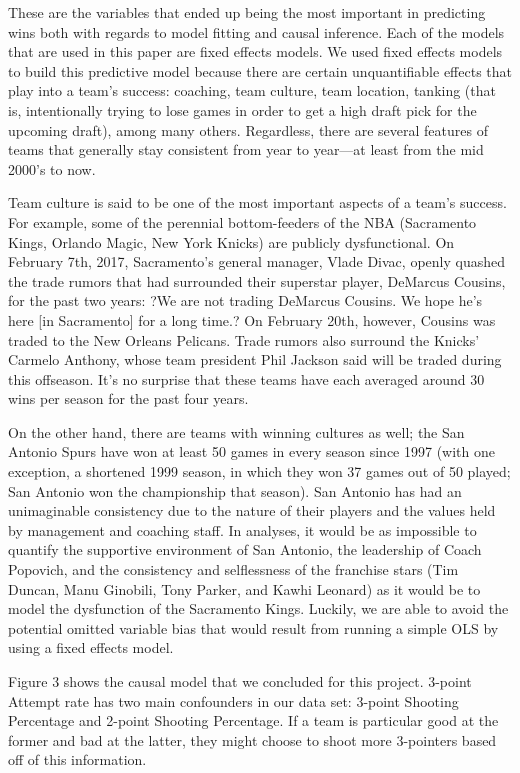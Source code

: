 \documentclass[12pt]{article}
\begin{document}
        	These are the variables that ended up being the most important in predicting wins both with regards to model fitting and causal inference. Each of the models that are used in this paper are fixed effects models. We used fixed effects models to build this predictive model because there are certain unquantifiable effects that play into a team's success: coaching, team culture, team location, tanking (that is, intentionally trying to lose games in order to get a high draft pick for the upcoming draft), among many others. Regardless, there are several features of teams that generally stay consistent from year to year---at least from the mid 2000's to now. \par       	
Team culture is said to be one of the most important aspects of a team's success. For example, some of the perennial bottom-feeders of the NBA (Sacramento Kings, Orlando Magic, New York Knicks) are publicly dysfunctional. On February 7th, 2017, Sacramento's general manager, Vlade Divac, openly quashed the trade rumors that had surrounded their superstar player, DeMarcus Cousins, for the past two years: ?We are not trading DeMarcus Cousins. We hope he's here [in Sacramento] for a long time.? On
February 20th, however, Cousins was traded to the New Orleans Pelicans. Trade rumors also surround the Knicks' Carmelo Anthony, whose team president Phil Jackson said will be traded during this offseason. It's no surprise that these teams have each averaged around 30 wins per season for the past four years. \par
On the other hand, there are teams with winning cultures as well; the San Antonio Spurs have won at least 50 games in every season since 1997 (with one exception, a shortened 1999 season, in which they won 37 games out of 50 played; San Antonio won the championship that season). San Antonio has had an unimaginable consistency due to the nature of their players and the values held by management and coaching staff. In analyses, it would be as impossible to quantify the supportive environment of San Antonio, the leadership of Coach Popovich, and the consistency and selflessness of the franchise stars (Tim Duncan, Manu Ginobili, Tony Parker, and Kawhi Leonard) as it would be to model the dysfunction of the Sacramento Kings. Luckily, we are able to avoid the potential omitted variable bias that would result from running a simple OLS by using a fixed effects model.\par
        	Figure 3 shows the causal model that we concluded for this project. 3-point Attempt rate has two main confounders in our data set: 3-point Shooting Percentage and 2-point Shooting Percentage. If a team is particular good at the former and bad at the latter, they might choose to shoot more 3-pointers based off of this information.\par
\end{document}

